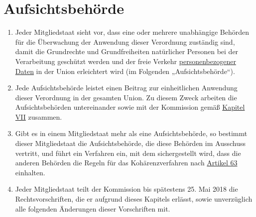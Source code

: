 \chapter{Aufsichtsbehörde}
\label{ch:51}


\begin{enumerate}

  \item Jeder Mitgliedstaat sieht vor, dass eine oder mehrere unabhängige Behörden für die Überwachung der Anwendung
   dieser Verordnung zuständig sind, damit die Grundrechte und Grundfreiheiten natürlicher Personen bei der
   Verarbeitung geschützt werden und der freie Verkehr \hyperref[itm:04-1]{personenbezogener Daten} in der Union erleichtert wird
   (im Folgenden „Aufsichtsbehörde“).
  \label{itm:51-1}

  \item Jede Aufsichtsbehörde leistet einen Beitrag zur einheitlichen Anwendung dieser Verordnung in der gesamten Union.
   Zu diesem Zweck arbeiten die Aufsichtsbehörden untereinander sowie mit der Kommission gemäß \hyperref[part:7]
   {Kapitel VII} zusammen.
  \label{itm:51-2}

  \item Gibt es in einem Mitgliedstaat mehr als eine Aufsichtsbehörde, so bestimmt dieser Mitgliedstaat die
   Aufsichtsbehörde, die diese Behörden im Ausschuss vertritt, und führt ein Verfahren ein, mit dem sichergestellt
   wird, dass die anderen Behörden die Regeln für das Kohärenzverfahren nach \hyperref[ch:63]{Artikel 63} einhalten.
  \label{itm:51-3}

  \item Jeder Mitgliedstaat teilt der Kommission bis spätestens 25. Mai 2018 die Rechtsvorschriften, die er aufgrund
   dieses Kapitels erlässt, sowie unverzüglich alle folgenden Änderungen dieser Vorschriften mit.
  \label{itm:51-4}

\end{enumerate}


